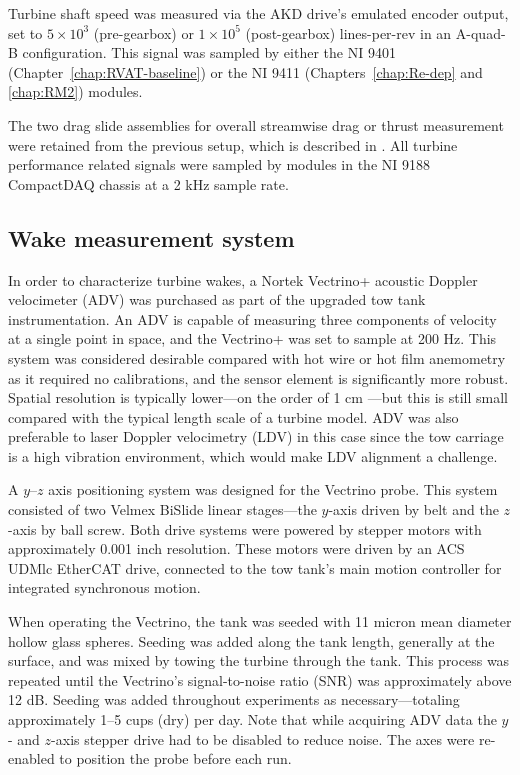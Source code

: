 Turbine shaft speed was measured via the AKD drive's emulated encoder output,
set to $5 \times 10^3$ (pre-gearbox) or $1 \times 10^5$ (post-gearbox)
lines-per-rev in an A-quad-B configuration. This signal was sampled by either
the NI 9401 (Chapter~\ref{chap:RVAT-baseline}) or the NI 9411
(Chapters~\ref{chap:Re-dep} and \ref{chap:RM2}) modules.

The two drag slide assemblies for overall streamwise drag or thrust measurement
were retained from the previous setup, which is described in
\cite{Bachant2011-MS}. All turbine performance related signals were sampled by
modules in the NI 9188 CompactDAQ chassis at a 2 kHz sample rate.


\subsection{Wake measurement system}

In order to characterize turbine wakes, a Nortek Vectrino+ acoustic Doppler
velocimeter (ADV) was purchased as part of the upgraded tow tank
instrumentation. An ADV is capable of measuring three components of velocity at
a single point in space, and the Vectrino+ was set to sample at 200 Hz. This
system was considered desirable compared with hot wire or hot film anemometry as
it required no calibrations, and the sensor element is significantly more
robust. Spatial resolution is typically lower---on the order of 1 cm
\cite{NortekVectrino}---but this is still small compared with the typical length
scale of a turbine model. ADV was also preferable to laser Doppler velocimetry
(LDV) in this case since the tow carriage is a high vibration environment, which
would make LDV alignment a challenge.

A $y$--$z$ axis positioning system was designed for the Vectrino probe. This
system consisted of two Velmex BiSlide linear stages---the $y$-axis driven by
belt and the $z$-axis by ball screw. Both drive systems were powered by stepper
motors with approximately 0.001 inch resolution. These motors were driven by an
ACS UDMlc EtherCAT drive, connected to the tow tank's main motion controller for
integrated synchronous motion.

When operating the Vectrino, the tank was seeded with 11 micron mean diameter
hollow glass spheres. Seeding was added along the tank length, generally at the
surface, and was mixed by towing the turbine through the tank. This process was
repeated until the Vectrino's signal-to-noise ratio (SNR) was approximately
above 12 dB. Seeding was added throughout experiments as necessary---totaling
approximately 1--5 cups (dry) per day. Note that while acquiring ADV data the
$y$- and $z$-axis stepper drive had to be disabled to reduce noise. The axes
were re-enabled to position the probe before each run.


